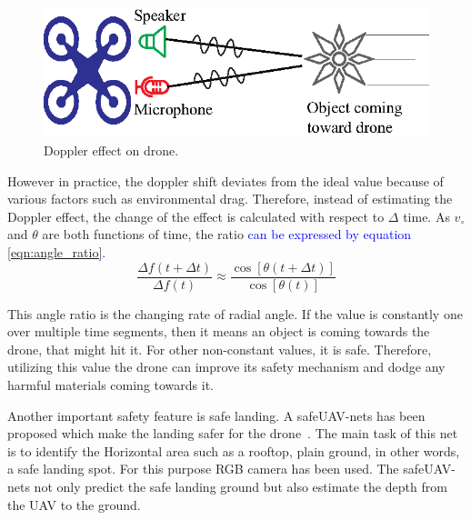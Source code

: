 \begin{figure}[h!]
\centering
\includegraphics[width=.7\linewidth]{figure/safety.eps}
\caption{Doppler effect on drone.}
\label{safety}
\end{figure}


 However in practice, the doppler shift deviates from the ideal value because of various factors such as environmental drag. Therefore, instead of estimating the Doppler effect, the change of the effect is calculated with respect to $\Delta $ time. As $v_{\circ}$ and $\theta$ are both functions of time, the ratio  \textcolor{blue}{can be expressed by equation \ref{eqn:angle_ratio}.} 
\begin{equation}
\label{eqn:angle_ratio}
   \frac{\Delta f(t+\Delta t)}{\Delta f(t)} \approx \frac{\cos \left[ \theta(t+\Delta t)\right]}{\cos \left[\theta(t)\right]} 
\end{equation}


This angle ratio is the changing rate of radial angle. If the value is constantly one over multiple time segments, then it means an object is coming towards the drone, that might hit it. For other non-constant values, it is safe. Therefore, utilizing this value the drone can improve its safety mechanism and dodge any harmful materials coming towards it.

Another important safety feature is safe landing. A safeUAV-nets has been proposed which make the landing safer for the drone~\cite{marcu2018safeuav}. The main task of this net is to identify the Horizontal area such as a rooftop, plain ground, in other words, a safe landing spot. For this purpose RGB camera has been used. The safeUAV-nets not only predict the safe landing ground but also estimate the depth from the UAV to the ground.


